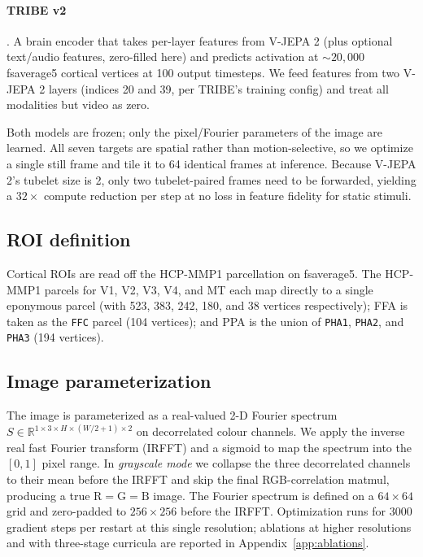 \documentclass{article}
\begin{document}
\paragraph{TRIBE v2} \citep[\texttt{facebook/tribev2};][]{tribev2}. A brain encoder that takes per-layer features from V-JEPA 2 (plus optional text/audio features, zero-filled here) and predicts activation at ${\sim}20{,}000$ fsaverage5 cortical vertices at 100 output timesteps. We feed features from two V-JEPA 2 layers (indices 20 and 39, per TRIBE's training config) and treat all modalities but video as zero.

Both models are frozen; only the pixel/Fourier parameters of the image are learned. All seven targets are spatial rather than motion-selective, so we optimize a single still frame and tile it to 64 identical frames at inference. Because V-JEPA 2's tubelet size is 2, only two tubelet-paired frames need to be forwarded, yielding a $32\times$ compute reduction per step at no loss in feature fidelity for static stimuli.

\subsection{ROI definition}
Cortical ROIs are read off the HCP-MMP1 \citep{glasser2016multimodal} parcellation on fsaverage5. The HCP-MMP1 parcels for V1, V2, V3, V4, and MT each map directly to a single eponymous parcel (with 523, 383, 242, 180, and 38 vertices respectively); FFA is taken as the \texttt{FFC} parcel (104 vertices); and PPA is the union of \texttt{PHA1}, \texttt{PHA2}, and \texttt{PHA3} (194 vertices).

\subsection{Image parameterization}
The image is parameterized as a real-valued 2-D Fourier spectrum $S \in \mathbb{R}^{1 \times 3 \times H \times (W/2+1) \times 2}$ on decorrelated colour channels. We apply the inverse real fast Fourier transform (IRFFT) and a sigmoid to map the spectrum into the $[0,1]$ pixel range. In \emph{grayscale mode} we collapse the three decorrelated channels to their mean before the IRFFT and skip the final RGB-correlation matmul, producing a true $\mathrm{R}=\mathrm{G}=\mathrm{B}$ image. The Fourier spectrum is defined on a $64\times64$ grid and zero-padded to $256\times256$ before the IRFFT. Optimization runs for 3000 gradient steps per restart at this single resolution; ablations at higher resolutions and with three-stage curricula are reported in Appendix~\ref{app:ablations}.
\end{document}
